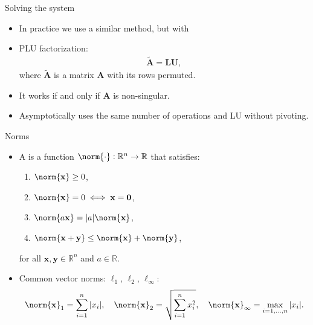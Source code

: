 \documentclass[11pt,xcolor={dvipsnames},aspectratio=159,hyperref={pdftex,pdfpagemode=UseNone,hidelinks,pdfdisplaydoctitle=true},usepdftitle=false]{beamer}
\begin{document}
\begin{frame}{Solving the system}
    \begin{itemize}
    \item In practice we use a similar method, but with 
    \item PLU factorization: \begin{align*}
        \tilde{\mathbf{A}} = \mathbf{L} \mathbf{U},
    \end{align*}
    where $\tilde{\mathbf{A}}$ is a matrix $\mathbf{A}$ with its rows permuted.
    \item It works if and only if $\mathbf{A}$ is non-singular.
    \item Asymptotically uses the same number of operations and LU without pivoting.
\end{itemize}
\end{frame}


\begin{frame}{Norms}
    \begin{itemize}
    \item A  is a function $\norm{\cdot}:\mathbb{R}^n \rightarrow \mathbb{R}$ that satisfies:
    \begin{enumerate}
        \item $\norm{\mathbf{x}} \geq 0$,
        \item $\norm{\mathbf{x}} = 0 \iff \mathbf{x} = \mathbf{0}$,
        \item $\norm{a\mathbf{x}} = |a|\norm{\mathbf{x}}$,
        \item $\norm{\mathbf{x} + \mathbf{y}} \leq \norm{\mathbf{x}} + \norm{\mathbf{y}}$,
    \end{enumerate}
    for all $\mathbf{x},\mathbf{y} \in \mathbb{R}^n$ and $a \in \mathbb{R}$.
    \item Common vector norms: $\ell_1$, $\ell_2$, $\ell_\infty$: \begin{align*}
        \norm{\mathbf{x}}_1 = \sum_{i=1}^n |x_i|, \quad \norm{\mathbf{x}}_2 = \sqrt{\sum_{i=1}^n x_i^2}, \quad \norm{\mathbf{x}}_\infty = \max_{i=1,\ldots,n} |x_i|.\end{align*}
\end{itemize}
\end{frame}
\end{document}
